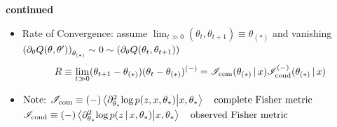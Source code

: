 \begin{frame} [t]
      {\bf continued}
\begin{itemize}
    \item Rate of Convergence:
        assume 
      $ \lim _{t \gg 0} 
        (\theta _{t}, \theta _{t+1})
        \equiv \theta _{(*)} 
      $ and vanishing 
      $ \qty  
        ( \partial _{\theta} 
          Q (\theta, \theta^{\prime})
        ) 
         _{\theta _{(*)}} 
        \sim 0 
        \sim 
        \qty  
        ( \partial _{\theta} Q 
          (\theta _{t} , \theta _{t+1} )
        ) 
      $ 
    { \footnotesize
    \begin{align*}
        R \equiv 
        \lim _{t \gg 0}
        ( \theta _{t+1} - \theta _{(*)}) 
        ( \theta _{t} - \theta _{(*)})
           ^{(-)}
        = 
        \mathscr {I} _{\text {com}} 
           ( \theta _{(*)} \,\vert\, x )
        \mathscr {I} _{\text {cond}} ^{(-)}
           ( \theta _{(*)} \,\vert\, x )
    \end{align*}
    }
    \item 
        {  
        $   \text {Note: } 
            \fisher _{\text {com}} 
            \equiv 
             (-)
            \braket 
            { \partial _{\theta _{*}} ^{2}
              \varlog p (z, x, \theta _{*} )
            } 
            {x, \theta _{*}} 
            \qq 
             {complete Fisher metric}
        $
        $
            \fisher _{\text {cond}} 
            \equiv 
             (-)
            \braket 
            { \partial _{\theta _{*}} ^{2}
              \varlog p  
              \conditional 
               {z} {x, \theta _{*} }
            } 
            {x, \theta _{*}} 
            \qq 
             {observed Fisher metric}
        $
        }
\end{itemize}
\end{frame}


